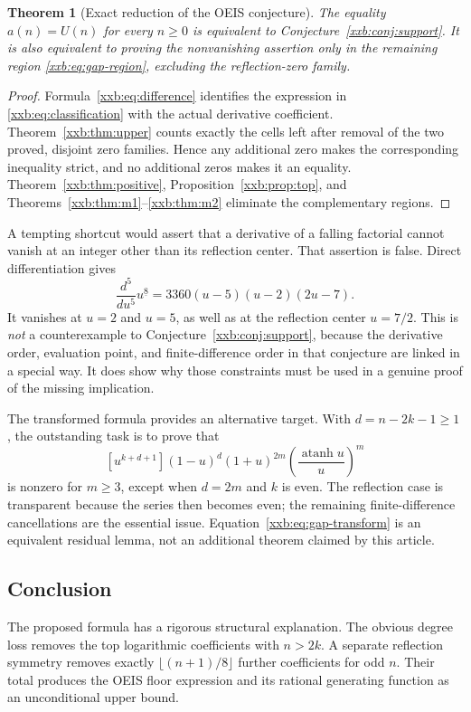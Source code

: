 \documentclass[11pt,a4paper]{article}
\numberwithin{equation}{section}
\newtheorem{theorem}{Theorem}[section]
\theoremstyle{definition}
\theoremstyle{remark}
\theoremstyle{plain}
\DeclareMathOperator{\atanh}{atanh}
\newcommand{\U}{U}
\newcommand{\fall}[2]{#1^{\underline{#2}}}
\begin{document}
\begin{theorem}[Exact reduction of the OEIS conjecture]\label{xxb:thm:equivalence}
The equality $a(n)=\U(n)$ for every $n\ge0$ is equivalent to
Conjecture~\ref{xxb:conj:support}. It is also equivalent to proving the
nonvanishing assertion only in the remaining region
\eqref{xxb:eq:gap-region}, excluding the reflection-zero family.
\end{theorem}
\begin{proof}
Formula~\eqref{xxb:eq:difference} identifies the expression in
\eqref{xxb:eq:classification} with the actual derivative coefficient.
Theorem~\ref{xxb:thm:upper} counts exactly the cells left after removal of the
two proved, disjoint zero families. Hence any additional zero makes the
corresponding inequality strict, and no additional zeros makes it an
equality. Theorem~\ref{xxb:thm:positive}, Proposition~\ref{xxb:prop:top}, and
Theorems~\ref{xxb:thm:m1}--\ref{xxb:thm:m2} eliminate the complementary regions.
\end{proof}

A tempting shortcut would assert that a derivative of a falling factorial
cannot vanish at an integer other than its reflection center. That
assertion is false. Direct differentiation gives
\begin{equation}\label{xxb:eq:false-shortcut}
 \frac{d^5}{du^5}\fall{u}{8}
 =3360(u-5)(u-2)(2u-7).
\end{equation}
It vanishes at $u=2$ and $u=5$, as well as at the reflection center
$u=7/2$. This is \emph{not} a counterexample to
Conjecture~\ref{xxb:conj:support}, because the derivative order, evaluation
point, and finite-difference order in that conjecture are linked in a
special way. It does show why those constraints must be used in a genuine
proof of the missing implication.

The transformed formula provides an alternative target. With
$d=n-2k-1\ge1$, the outstanding task is to prove that
\begin{equation}\label{xxb:eq:gap-transform}
 [u^{k+d+1}](1-u)^d(1+u)^{2m}
       \left(\frac{\atanh u}{u}\right)^m
\end{equation}
is nonzero for $m\ge3$, except when $d=2m$ and $k$ is even. The
reflection case is transparent because the series then becomes even;
the remaining finite-difference cancellations are the essential issue.
Equation~\eqref{xxb:eq:gap-transform} is an equivalent residual lemma, not an
additional theorem claimed by this article.

\subsection{Conclusion}
The proposed formula has a rigorous structural explanation. The obvious
degree loss removes the top logarithmic coefficients with $n>2k$.
A separate reflection symmetry removes exactly
$\lfloor(n+1)/8\rfloor$ further coefficients for odd $n$. Their total
produces the OEIS floor expression and its rational generating function
as an unconditional upper bound.
\end{document}
